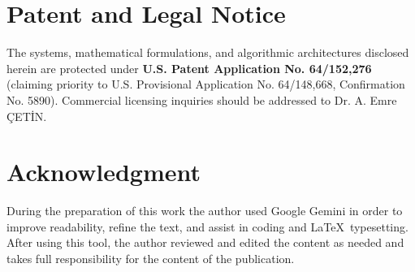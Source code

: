 \documentclass[journal,10pt,twocolumn]{article}
\begin{document}
\begin{table}[h]
\centering
\caption{Performance Comparison: Naive $\mathcal{O}(N^2)$ vs IdemSpatial $\mathcal{O}(N)$}
\label{tab:perf}
\end{table}

\section{Patent and Legal Notice}
The systems, mathematical formulations, and algorithmic architectures disclosed herein are protected under \textbf{U.S. Patent Application No. 64/152,276} (claiming priority to U.S. Provisional Application No. 64/148,668, Confirmation No. 5890). Commercial licensing inquiries should be addressed to Dr. A. Emre \c{C}ET\.{I}N.

\section*{Acknowledgment}
During the preparation of this work the author used Google Gemini in order to improve readability, refine the text, and assist in coding and \LaTeX\ typesetting. After using this tool, the author reviewed and edited the content as needed and takes full responsibility for the content of the publication.
\end{document}
